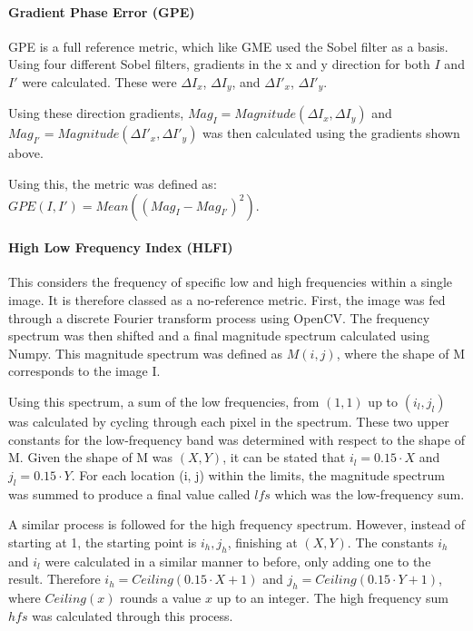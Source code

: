 \documentclass[10pt,a4paper]{article}
\begin{document}
            \paragraph{Gradient Phase Error (GPE)}
                GPE is a full reference metric, which like GME used the Sobel filter as a basis. Using four different Sobel filters, gradients in the x and y direction for both
                $I$ and $I'$ were calculated. These were $\Delta I_x$, $\Delta I_y$, and $\Delta I'_x$, $\Delta I'_y$.

                Using these direction gradients, $Mag_{I} = Magnitude(\Delta I_x, \Delta I_y)$ and $Mag_{I'} = Magnitude(\Delta I'_x, \Delta I'_y)$ was then calculated using the gradients shown above.

                Using this, the metric was defined as: $GPE(I, I') = Mean((Mag_{I} - Mag_{I'})^2)$.

            \paragraph{High Low Frequency Index (HLFI)}
                This considers the frequency of specific low and high frequencies within a single image. It is therefore classed as a no-reference metric.
                First, the image was fed through a discrete Fourier transform process using OpenCV. The frequency spectrum was then shifted and a final magnitude spectrum calculated using Numpy. This magnitude spectrum was defined as $M(i, j)$, where the shape of M corresponds to the image I.

                Using this spectrum, a sum of the low frequencies, from $(1,1)$ up to $(i_l, j_l)$ was calculated by cycling through each pixel in the spectrum. These two upper constants for
                the low-frequency band was determined with respect to the shape of M. Given the shape of M was $(X, Y)$, it can be stated that $i_l = 0.15 \cdot X$ and $j_l = 0.15 \cdot Y$.
                For each location (i, j) within the limits, the magnitude spectrum was summed to produce a final value called $lfs$ which was the low-frequency sum.

                A similar process is followed for the high frequency spectrum. However, instead of starting at 1, the starting point is $i_h, j_h$, finishing at $(X, Y)$. The constants $i_h$ and $i_l$ were
                calculated in a similar manner to before, only adding one to the result. Therefore $i_h = Ceiling(0.15 \cdot X + 1)$ and $j_h = Ceiling(0.15 \cdot Y + 1)$, where $Ceiling(x)$ rounds
                a value $x$ up to an integer. The high frequency sum $hfs$ was calculated through this process.
\end{document}
